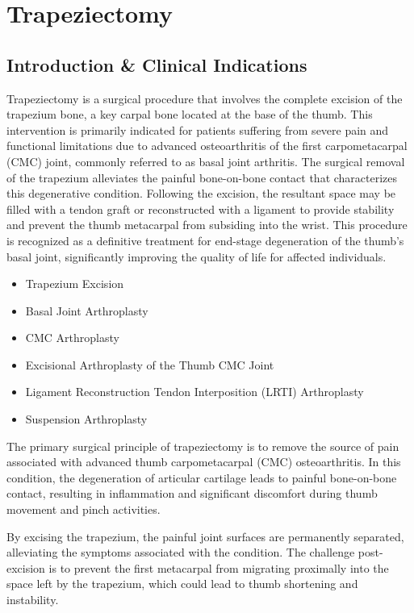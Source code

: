 \chapter{Trapeziectomy}

\section*{Introduction \& Clinical Indications}
Trapeziectomy is a surgical procedure that involves the complete excision of the trapezium bone, a key carpal bone located at the base of the thumb. This intervention is primarily indicated for patients suffering from severe pain and functional limitations due to advanced osteoarthritis of the first carpometacarpal (CMC) joint, commonly referred to as basal joint arthritis. The surgical removal of the trapezium alleviates the painful bone-on-bone contact that characterizes this degenerative condition. Following the excision, the resultant space may be filled with a tendon graft or reconstructed with a ligament to provide stability and prevent the thumb metacarpal from subsiding into the wrist. This procedure is recognized as a definitive treatment for end-stage degeneration of the thumb's basal joint, significantly improving the quality of life for affected individuals.

\begin{itemize}
  \item Trapezium Excision
  \item Basal Joint Arthroplasty
  \item CMC Arthroplasty
  \item Excisional Arthroplasty of the Thumb CMC Joint
  \item Ligament Reconstruction Tendon Interposition (LRTI) Arthroplasty
  \item Suspension Arthroplasty
\end{itemize}

The primary surgical principle of trapeziectomy is to remove the source of pain associated with advanced thumb carpometacarpal (CMC) osteoarthritis. In this condition, the degeneration of articular cartilage leads to painful bone-on-bone contact, resulting in inflammation and significant discomfort during thumb movement and pinch activities. 

By excising the trapezium, the painful joint surfaces are permanently separated, alleviating the symptoms associated with the condition. The challenge post-excision is to prevent the first metacarpal from migrating proximally into the space left by the trapezium, which could lead to thumb shortening and instability. 

